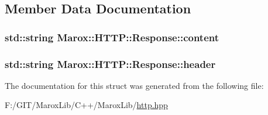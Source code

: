 \subsection{Member Data Documentation}
\hypertarget{struct_marox_1_1_h_t_t_p_1_1_response_ab9dcbd31a2cd6c6bcbd4f4358e87a6bf}{}
\subsubsection[{content}]{\setlength{\rightskip}{0pt plus 5cm}std\+::string Marox\+::\+H\+T\+T\+P\+::\+Response\+::content}\label{struct_marox_1_1_h_t_t_p_1_1_response_ab9dcbd31a2cd6c6bcbd4f4358e87a6bf}
\hypertarget{struct_marox_1_1_h_t_t_p_1_1_response_a4f27d2c1d1c31f40fa7cb9813252f816}{}
\subsubsection[{header}]{\setlength{\rightskip}{0pt plus 5cm}std\+::string Marox\+::\+H\+T\+T\+P\+::\+Response\+::header}\label{struct_marox_1_1_h_t_t_p_1_1_response_a4f27d2c1d1c31f40fa7cb9813252f816}


The documentation for this struct was generated from the following file\+:\begin{DoxyCompactItemize}
\item 
F\+:/\+G\+I\+T/\+Marox\+Lib/\+C++/\+Marox\+Lib/\hyperlink{http_8hpp}{http.\+hpp}\end{DoxyCompactItemize}
